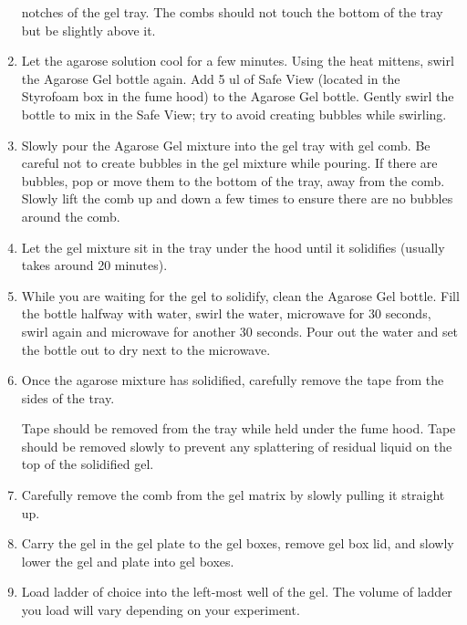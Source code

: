 \documentclass[
  letterpaper,
  DIV=11,
  numbers=noendperiod]{scrreprt}
\begin{document}
\begin{enumerate}
  notches of the gel tray. The combs should not touch the bottom of the
  tray but be slightly above it.
\item
  Let the agarose solution cool for a few minutes. Using the heat
  mittens, swirl the Agarose Gel bottle again. Add 5 ul of Safe View
  (located in the Styrofoam box in the fume hood) to the Agarose Gel
  bottle. Gently swirl the bottle to mix in the Safe View; try to avoid
  creating bubbles while swirling.
\item
  Slowly pour the Agarose Gel mixture into the gel tray with gel comb.
  Be careful not to create bubbles in the gel mixture while pouring. If
  there are bubbles, pop or move them to the bottom of the tray, away
  from the comb. Slowly lift the comb up and down a few times to ensure
  there are no bubbles around the comb.
\item
  Let the gel mixture sit in the tray under the hood until it solidifies
  (usually takes around 20 minutes).
\item
  While you are waiting for the gel to solidify, clean the Agarose Gel
  bottle. Fill the bottle halfway with water, swirl the water, microwave
  for 30 seconds, swirl again and microwave for another 30 seconds. Pour
  out the water and set the bottle out to dry next to the microwave.
\item
  Once the agarose mixture has solidified, carefully remove the tape
  from the sides of the tray.

  \begin{tcolorbox}[enhanced jigsaw, rightrule=.15mm, title=\textcolor{quarto-callout-important-color}{\faExclamation}\hspace{0.5em}{This is important}, titlerule=0mm, opacitybacktitle=0.6, toprule=.15mm, bottomrule=.15mm, opacityback=0, left=2mm, colframe=quarto-callout-important-color-frame, breakable, coltitle=black, colback=white, colbacktitle=quarto-callout-important-color!10!white, bottomtitle=1mm, leftrule=.75mm, toptitle=1mm, arc=.35mm]

  Tape should be removed from the tray while held under the fume hood.
  Tape should be removed slowly to prevent any splattering of residual
  liquid on the top of the solidified gel.

  \end{tcolorbox}
\item
  Carefully remove the comb from the gel matrix by slowly pulling it
  straight up.
\item
  Carry the gel in the gel plate to the gel boxes, remove gel box lid,
  and slowly lower the gel and plate into gel boxes.
\item
  Load ladder of choice into the left-most well of the gel. The volume
  of ladder you load will vary depending on your experiment.


\end{enumerate}
\end{document}
